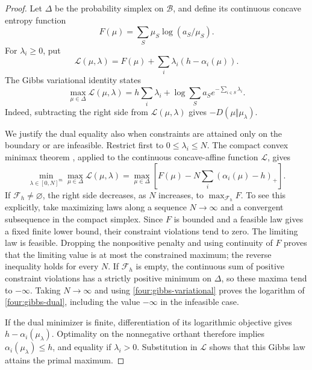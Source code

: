 \begin{proof}
Let \(\Delta\) be the probability simplex on \(\mathcal B\),
and define its continuous concave entropy function
\[
 F(\mu)=\sum_S\mu_S\log(a_S/\mu_S).
\]
For \(\lambda_i\geq0\), put
\[
 \mathcal L(\mu,\lambda)
 =F(\mu)+\sum_i\lambda_i(h-\alpha_i(\mu)).
\]
The Gibbs variational identity states
\begin{equation}\label{four:gibbs-variational}
 \max_{\mu\in\Delta}\mathcal L(\mu,\lambda)
 =h\sum_i\lambda_i+
         \log\sum_S a_S e^{-\sum_{i\in S}\lambda_i}.
\end{equation}
Indeed, subtracting the right side from
\(\mathcal L(\mu,\lambda)\) gives
\(-D(\mu\Vert\mu_\lambda)\).

We justify the dual equality also when constraints are attained
only on the boundary or are infeasible.
Restrict first to \(0\leq\lambda_i\leq N\).
The compact convex minimax theorem \citep{Sion1958}, applied to
the continuous concave-affine function \(\mathcal L\), gives
\[
 \min_{\lambda\in[0,N]^m}\max_{\mu\in\Delta}\mathcal L(\mu,\lambda)
 =\max_{\mu\in\Delta}
   \left[F(\mu)-N\sum_i(\alpha_i(\mu)-h)_+\right].
\]
If \(\mathcal F_h\ne\varnothing\), the right side decreases,
as \(N\) increases, to \(\max_{\mathcal F_h}F\).
To see this explicitly, take maximizing laws along a sequence
\(N\to\infty\) and a convergent subsequence in the compact
simplex.  Since \(F\) is bounded and a feasible law gives a
fixed finite lower bound, their constraint violations tend
to zero.  The limiting law is feasible.  Dropping the
nonpositive penalty and using continuity of \(F\) proves that
the limiting value is at most the constrained maximum; the
reverse inequality holds for every \(N\).
If \(\mathcal F_h\) is empty, the continuous sum of positive
constraint violations has a strictly positive minimum on
\(\Delta\), so these maxima tend to \(-\infty\).
Taking \(N\to\infty\) and using
\eqref{four:gibbs-variational} proves the logarithm of
\eqref{four:gibbs-dual}, including the value \(-\infty\)
in the infeasible case.

If the dual minimizer is finite, differentiation of its
logarithmic objective gives \(h-\alpha_i(\mu_\lambda)\).
Optimality on the nonnegative orthant therefore implies
\(\alpha_i(\mu_\lambda)\leq h\), and equality if
\(\lambda_i>0\).  Substitution in \(\mathcal L\) shows that
this Gibbs law attains the primal maximum.


\end{proof}
